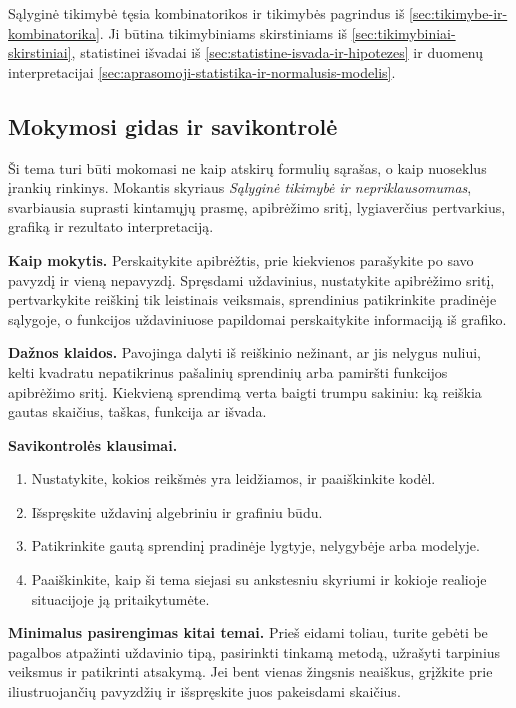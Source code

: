 Sąlyginė tikimybė tęsia kombinatorikos ir tikimybės pagrindus iš \ref{sec:tikimybe-ir-kombinatorika}. Ji būtina tikimybiniams skirstiniams iš \ref{sec:tikimybiniai-skirstiniai}, statistinei išvadai iš \ref{sec:statistine-isvada-ir-hipotezes} ir duomenų interpretacijai \ref{sec:aprasomoji-statistika-ir-normalusis-modelis}.

\subsection{Mokymosi gidas ir savikontrolė}

Ši tema turi būti mokomasi ne kaip atskirų formulių sąrašas, o kaip nuoseklus įrankių rinkinys. Mokantis skyriaus \textit{Sąlyginė tikimybė ir nepriklausomumas}, svarbiausia suprasti kintamųjų prasmę, apibrėžimo sritį, lygiaverčius pertvarkius, grafiką ir rezultato interpretaciją.

\textbf{Kaip mokytis.} Perskaitykite apibrėžtis, prie kiekvienos parašykite po savo pavyzdį ir vieną nepavyzdį. Spręsdami uždavinius, nustatykite apibrėžimo sritį, pertvarkykite reiškinį tik leistinais veiksmais, sprendinius patikrinkite pradinėje sąlygoje, o funkcijos uždaviniuose papildomai perskaitykite informaciją iš grafiko.

\textbf{Dažnos klaidos.} Pavojinga dalyti iš reiškinio nežinant, ar jis nelygus nuliui, kelti kvadratu nepatikrinus pašalinių sprendinių arba pamiršti funkcijos apibrėžimo sritį. Kiekvieną sprendimą verta baigti trumpu sakiniu: ką reiškia gautas skaičius, taškas, funkcija ar išvada.

\textbf{Savikontrolės klausimai.}
\begin{enumerate}[label=\arabic*.]
\item Nustatykite, kokios reikšmės yra leidžiamos, ir paaiškinkite kodėl.
\item Išspręskite uždavinį algebriniu ir grafiniu būdu.
\item Patikrinkite gautą sprendinį pradinėje lygtyje, nelygybėje arba modelyje.
\item Paaiškinkite, kaip ši tema siejasi su ankstesniu skyriumi ir kokioje realioje situacijoje ją pritaikytumėte.
\end{enumerate}

\textbf{Minimalus pasirengimas kitai temai.} Prieš eidami toliau, turite gebėti be pagalbos atpažinti uždavinio tipą, pasirinkti tinkamą metodą, užrašyti tarpinius veiksmus ir patikrinti atsakymą. Jei bent vienas žingsnis neaiškus, grįžkite prie iliustruojančių pavyzdžių ir išspręskite juos pakeisdami skaičius.

